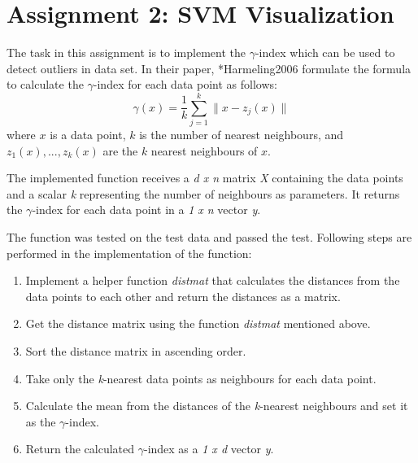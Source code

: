 \section{Assignment 2: SVM Visualization}
\label{sec:assignment2}

The task in this assignment is to implement the $\gamma$-index which can be used to detect outliers in data set. In their paper, \citeasnoun**{Harmeling2006} formulate the formula to calculate the $\gamma$-index for each data point as follows:
\begin{equation}
	\gamma(x)=\frac{1}{k} \sum_{j=1}^{k} \| x-z_j(x) \|
\end{equation}
where $x$ is a data point, $k$ is the number of nearest neighbours, and $z_1(x),...,z_k(x)$ are the $k$ nearest neighbours of $x$.

The implemented function receives a \textit{d x n} matrix \textit{X} containing the data points and a scalar \textit{k} representing the number of neighbours as parameters. It returns the $\gamma$-index for each data point in a \textit{1 x n} vector \textit{y}.

The function was tested on the test data and passed the test. Following steps are performed in the implementation of the function:
\begin{enumerate}
	\item Implement a helper function \textit{distmat} that calculates the distances from the data points to each other and return the distances as a matrix.
	\item Get the distance matrix using the function \textit{distmat} mentioned above.
	\item Sort the distance matrix in ascending order.
	\item Take only the \textit{k}-nearest data points as neighbours for each data point.
	\item Calculate the mean from the distances of the \textit{k}-nearest neighbours and set it as the $\gamma$-index.
	\item Return the calculated $\gamma$-index as a \textit{1 x d} vector \textit{y}.
	
\end{enumerate}

